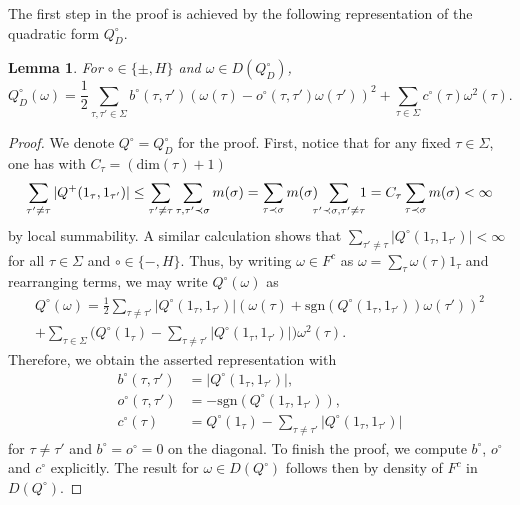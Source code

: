 \documentclass[10pt]{amsart}
\newtheorem{lemma}[theorem]{Lemma}
\theoremstyle{definition}
\newcommand{\F}{{F}}
\renewcommand{\bullet}{{\circ}}
\begin{document}
The first step in the proof is achieved by the following representation of the quadratic form $Q^{\bullet}_{D}$.

\begin{lemma}\label{schröd}
  For $\bullet\in\{\pm,H\}$ and $\omega\in D(Q^{\circ}_{D})$,
    $$Q^\bullet_{D}(\omega) = \frac{1}{2}\sum_{\tau,\tau'\in\Sigma}b^\bullet(\tau,\tau')(\omega(\tau)-o^\bullet(\tau,\tau')\omega(\tau'))^2+\sum_{\tau\in\Sigma}c^\bullet(\tau)\omega^2(\tau).$$
\end{lemma}
\begin{proof}We denote $ Q^{\bullet}=Q^{\bullet}_{D}$ for the proof.
First, notice that for any fixed $\tau\in\Sigma$, one has with $C_{\tau}=(\mathrm{dim}(\tau)+1)$ $$\sum_{\tau'\neq\tau}\vert Q^+(1_\tau,1_{\tau'})\vert \leq \sum_{\tau'\neq\tau}\sum_{\tau,\tau'\prec\sigma}m(\sigma) = \sum_{\tau\prec\sigma}m(\sigma)\hspace{-.2cm}\sum_{\tau'\prec\sigma,\tau'\neq\tau}\hspace{-.2cm}1 = C_{\tau}\sum_{\tau\prec\sigma}m(\sigma)<\infty$$ by local summability. A similar calculation shows that $\sum_{\tau'\neq\tau}\vert Q^\bullet(1_\tau,1_{\tau'})\vert<\infty$ for all $\tau\in \Sigma$ and $\bullet \in\{-,H\}.$
Thus, by writing $\omega\in \F^c$ as $\omega = \sum_{\tau}\omega(\tau)1_\tau$ and rearranging terms, we may write $Q^\bullet(\omega)$ as  
\begin{multline*}
    Q^\bullet(\omega) = \frac{1}{2}\sum_{\tau\neq\tau'}\vert Q^\bullet(1_\tau,1_{\tau'})\vert\left(\omega(\tau)+\mathrm{sgn}(Q^\bullet(1_\tau,1_{\tau'}))\omega(\tau')\right)^2\\
    +\sum_{\tau\in\Sigma}\Big(Q^\bullet(1_\tau)-\sum_{\tau\neq\tau'}\vert Q^\bullet(1_\tau,1_{\tau'})\vert\Big)\omega^2(\tau).
\end{multline*}
    Therefore, we obtain the asserted representation with
    \begin{align*}
        b^\bullet(\tau,\tau') &= \vert Q^\bullet(1_\tau,1_{\tau'})\vert,\\
        o^\bullet(\tau,\tau') &= -\mathrm{sgn}(Q^\bullet(1_\tau,1_{\tau'})),\\
        c^\bullet(\tau) &= Q^\bullet(1_\tau)-\sum_{\tau\neq\tau'}\vert Q^\bullet(1_\tau,1_{\tau'})\vert
    \end{align*}
     for $\tau\neq\tau'$ and $b^{\bullet}=o^{\bullet}=0$ on the diagonal.
    To finish the proof, we  compute $b^{\bullet}$, $o^{\bullet}$ and $c^{\bullet}$ explicitly. The result for $\omega\in D(Q^{\bullet})$ follows then by density of $\F^{c}$ in $D(Q^{\bullet})$.
    

\end{proof}
\end{document}
